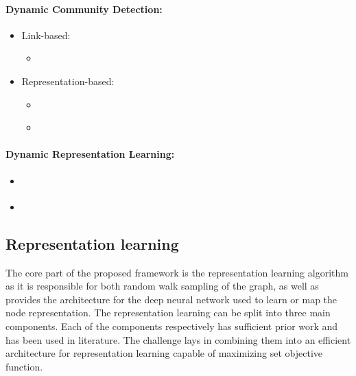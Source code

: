 \documentclass[
acmsmall,
nonacm,
screen,
acmthm]{../../scripts/pandoc/templates/acmart}
\providecommand{\tightlist}{%
\setlength{\itemsep}{0pt}\setlength{\parskip}{0pt}}
\begin{document}
\hypertarget{dynamic-community-detection-1}{%
\paragraph{Dynamic Community
Detection:}\label{dynamic-community-detection-1}}

\begin{itemize}
\tightlist
\item
  Link-based:

  \begin{itemize}
  \tightlist
  \item
    \citet{rossettiANGELEfficientEffective2020}
  \end{itemize}
\item
  Representation-based:

  \begin{itemize}
  \tightlist
  \item
    \citet{wangEvolutionaryAutoencoderDynamic2020}
  \item
    \citet{maCommunityawareDynamicNetwork2020}
  \end{itemize}
\end{itemize}

\hypertarget{dynamic-representation-learning}{%
\paragraph{Dynamic Representation
Learning:}\label{dynamic-representation-learning}}

\begin{itemize}
\tightlist
\item
  \citet{nguyenContinuousTimeDynamicNetwork2018}
\item
  \citet{wuSageDyNovelSampling2021}
\end{itemize}

\hypertarget{representation-learning}{%
\subsection{Representation learning}\label{representation-learning}}

The core part of the proposed framework is the representation learning
algorithm as it is responsible for both random walk sampling of the
graph, as well as provides the architecture for the deep neural network
used to learn or map the node representation. The representation
learning can be split into three main components. Each of the components
respectively has sufficient prior work and has been used in literature.
The challenge lays in combining them into an efficient architecture for
representation learning capable of maximizing set objective function.
\end{document}
